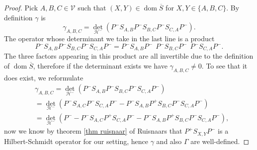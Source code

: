 \documentclass[b5paper,draft,openbib,12pt]{memoir}
\DeclareMathOperator{\dom}{dom}
\begin{document}
\begin{proof}
Pick  \(A,B,C\in\mathcal{V}\) such that \((X,Y)\in \dom\overline{S}\) for \(X,Y\in\{A,B,C\}\). 
By definition \(\gamma\) is
\begin{equation}
\gamma_{A,B,C}=\det_{\mathcal{H}^-}(P^- S_{A,B} P^- S_{B,C} P^- S_{C,A} P^-).
\end{equation}
The operator whose determinant we take in the last line is a product
\begin{equation}
P^- S_{A,B} P^- S_{B,C} P^- S_{C,A} P^-=P^- S_{A,B}P^-~~ P^- S_{B,C}P^-~~ P^- S_{C,A} P^-.
\end{equation}
The three factors appearing in this product are all invertible due to the definition of 
\(\dom\overline{S}\), 
therefore if the determinant exists we have \(\gamma_{A,B,C}\neq 0\).
To see that it does exist, we reformulate
\begin{align}
&\gamma_{A,B,C}=\det_{\mathcal{H}^-}(P^- S_{A,B} P^- S_{B,C} P^- S_{C,A} P^-)\\
&=\det_{\mathcal{H}^-}(P^-S_{A,C}P^-S_{C,A}P^- - P^- S_{A,B} P^+ S_{B,C} P^- S_{C,A} P^-)\\\label{eq: gamma proof of first attri}
&=\det_{\mathcal{H}^-}(P^--P^-S_{A,C}P^+S_{C,A}P^- - P^- S_{A,B} P^+ S_{B,C} P^- S_{C,A} P^-),
\end{align}
now we know by theorem \ref{thm ruisnaar} of Ruisnaars that \(P^+S_{X,Y}P^-\) 
is a Hilbert-Schmidt operator for our setting,
hence \(\gamma\) and also \(\Gamma\) are well-defined.


\end{proof}
\end{document}
